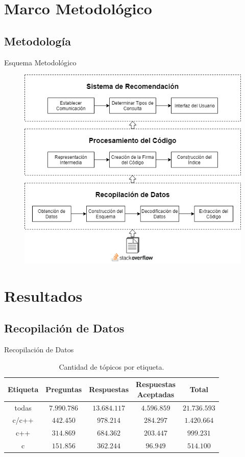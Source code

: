 \documentclass{beamer}
\begin{document}
\section{Marco Metodológico}
\subsection*{Metodología}
\begin{frame}{Esquema Metodológico}
\begin{figure}
\includegraphics[width=0.6\linewidth]{metodo}
\end{figure}
\end{frame}

\section{Resultados}
\subsection{Recopilación de Datos}
\begin{frame}{Recopilación de Datos}
\begin{table}[h]
\caption{Cantidad de tópicos por etiqueta.}
\centering
\begin{tabular}{ccccc}
\hline
{Etiqueta} & {Preguntas} & {Respuestas} & \makecell{Respuestas\\Aceptadas} & {Total} \\
\hline
{todas} & $7.990.786$ & $13.684.117$ & $4.596.859$ & $21.736.593$ \\ 
{c/c++} & $442.450$ & $978.214$ & $284.297$ & $1.420.664$ \\ 
{c++} & $314.869$ & $684.362$ & $203.447$ & $999.231$ \\ 
{c} & $151.856$ & $362.244$ & $96.949$ & $514.100$ \\
\hline
\end{tabular}
\end{table}
\end{frame}
\end{document}
